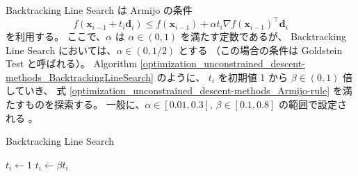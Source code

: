 Backtracking Line Search \cite[Section 9.2]{Boyd2004} は
Armijo の条件 \cite[Section 7.5]{Luenberger2003}
\begin{equation}
    f(\bm{x}_{i-1} + t_i \bm{d}_i) \le f(\bm{x}_{i-1}) + \alpha t_i \nabla f(\bm{x}_{i-1})^\top \bm{d}_i
    \label{optimization_unconstrained_descent-methods_Armijo-rule}
\end{equation}
を利用する。
ここで、$\alpha$ は $\alpha \in (0,1)$ を満たす定数であるが、
Backtracking Line Search においては、$\alpha \in (0, 1/2)$ とする
（この場合の条件は Goldstein Test \cite[Section 7.5]{Luenberger2003} と呼ばれる）。
Algorithm \ref{optimization_unconstrained_descent-methods_BacktrackingLineSearch}
のように、
$t_i$ を初期値 1 から $\beta \in (0, 1)$ 倍していき、
式 \eqref{optimization_unconstrained_descent-methods_Armijo-rule} を満たすものを探索する。
一般に、$\alpha \in [0.01, 0.3]$, $\beta \in [0.1, 0.8]$ の範囲で設定される
\cite[Section 9.2]{Boyd2004}。

\begin{algorithm}[hp]
    \caption{Backtracking Line Search \cite[Section 9.2]{Boyd2004}}
    \label{optimization_unconstrained_descent-methods_BacktrackingLineSearch}
    \begin{algorithmic}
            \State $t_i \gets 1$
                \State $t_i \gets \beta t_i$
            \EndWhile
        \EndProcedure
    \end{algorithmic}
\end{algorithm}
